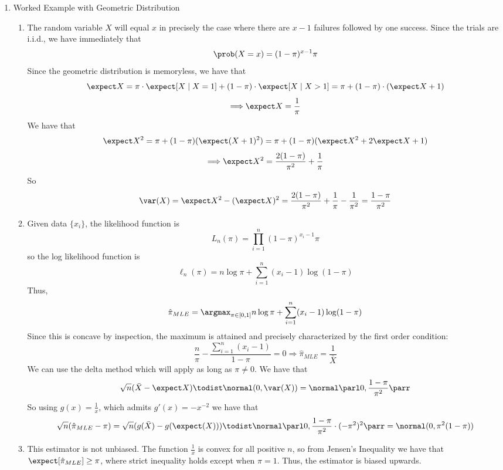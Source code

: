 \documentclass[10pt]{article}
\begin{document}
\begin{enumerate}
	\item Worked Example with Geometric Distribution \begin{enumerate} \item The random variable $X$ will equal $x$ in precisely the case where there are $x-1$ failures followed by one success. Since the trials are i.i.d., we have immediately that \[\prob(X = x) = (1-\pi)^{x-1}\pi\] Since the geometric distribution is memoryless, we have that \[\expect X = \pi \cdot \expect[X \mid X = 1] + (1-\pi) \cdot \expect[X \mid X > 1] = \pi + (1-\pi) \cdot (\expect X + 1)\]\[\Longrightarrow \expect X = \frac{1}{\pi}\]We have that \[\expect X^2 = \pi + (1-\pi)(\expect (X + 1)^2) = \pi + (1-\pi) (\expect X^2 + 2\expect X + 1)\]\[\Longrightarrow \expect X^2 = \frac{2(1-\pi)}{\pi^2} + \frac{1}{\pi}\]So\[\var(X) = \expect X^2 - (\expect X)^2 = \frac{2(1-\pi)}{\pi^2} + \frac{1}{\pi} - \frac{1}{\pi^2} = \frac{1-\pi}{\pi^2}\] \item Given data $\{x_i\}$, the likelihood function is \[L_n(\pi) = \prod_{i=1}^n (1-\pi)^{x_i - 1} \pi\]so the log likelihood function is \[\ell_n(\pi) = n \log \pi + \sum_{i=1}^n (x_i - 1)\log (1-\pi)\]Thus, \[\hat{\pi}_{MLE} = \argmax_{\pi \in [0,1]}  n \log \pi + \sum_{i=1}^n (x_i - 1)\log (1-\pi)\]Since this is concave by inspection, the maximum is attained and precisely characterized by the first order condition:\[ \frac{n}{\pi} - \frac{\sum_{i=1}^n (x_i - 1)}{1-\pi} = 0 \Longrightarrow \hat{\pi}_{MLE} = \frac{1}{\bar{X}}\]We can use the delta method which will apply as long as $\pi \ne 0$. We have that \[\sqrt{n}(\bar{X} - \expect X) \todist \normal(0,\var(X)) = \normal\parl 0,\frac{1-\pi}{\pi^2}\parr \]So using $g(x) = \frac{1}{x}$, which admits $g'(x) = -x^{-2}$ we have that\[\sqrt{n}(\hat{\pi}_{MLE} - \pi) = \sqrt{n}(g(\bar{X}) - g(\expect(X))) \todist \normal\parl 0, \frac{1-\pi}{\pi^2} \cdot (-\pi^2)^2\parr = \normal(0,\pi^2(1-\pi))\] \item This estimator is not unbiased. The function $\frac{1}{x}$ is convex for all positive $n$, so from Jensen's Inequality we have that $\expect[\hat{\pi}_{MLE}] \ge \pi$, where strict inequality holds except when $\pi=1$. Thus, the estimator is biased upwards. \end{enumerate}

\end{enumerate}
\end{document}
